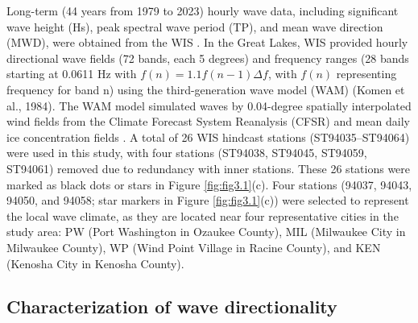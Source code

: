 Long-term (44 years from 1979 to 2023) hourly wave data, including significant
wave height (Hs), peak spectral wave period (TP), and mean wave direction (MWD),
were obtained from the WIS \citep{hubertz_wind-waves_1991}. In the Great Lakes,
WIS provided hourly directional wave fields (72 bands, each 5 degrees) and
frequency ranges (28 bands starting at 0.0611 Hz with $f(n)=1.1f(n-1)\Delta f$,
with $f(n)$ representing frequency for band n) using the third-generation wave
model (WAM) (Komen et al., 1984). The WAM model simulated waves by 0.04-degree
spatially interpolated wind fields from the Climate Forecast System Reanalysis
(CFSR) \citep{saha_ncep_2010,saha_ncep_2014} and mean daily ice concentration
fields \citep{yang_consistent_2020}. A total of 26 WIS hindcast stations
(ST94035–ST94064) were used in this study, with four stations (ST94038, ST94045,
ST94059, ST94061) removed due to redundancy with inner stations. These 26
stations were marked as black dots or stars in Figure \ref{fig:fig3.1}(c). Four
stations (94037, 94043, 94050, and 94058; star markers in Figure
\ref{fig:fig3.1}(c)) were selected to represent the local wave climate, as they
are located near four representative cities in the study area: PW (Port
Washington in Ozaukee County), MIL (Milwaukee City in Milwaukee County), WP
(Wind Point Village in Racine County), and KEN (Kenosha City in Kenosha County).

\subsection{Characterization of wave directionality}

